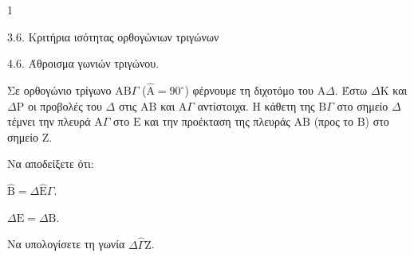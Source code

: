\begin{ylh}{1}
    \item 3.6. Κριτήρια ισότητας ορθογώνιων τριγώνων
    \item 4.6. Άθροισμα γωνιών τριγώνου.
\end{ylh}
Σε ορθογώνιο τρίγωνο $\mathrm{A}\mathrm{B}\Gamma$ ($\hat{\mathrm{A}} = 90^\circ$) φέρνουμε τη διχοτόμο του $\mathrm{A}\Delta$. Έστω $\Delta\mathrm{K}$ και $\Delta\mathrm{P}$ οι προβολές του $\Delta$ στις $\mathrm{A}\mathrm{B}$ και $\mathrm{A}\Gamma$ αντίστοιχα. Η κάθετη της $\mathrm{B}\Gamma$ στο σημείο $\Delta$ τέμνει την πλευρά $\mathrm{A}\Gamma$ στο $\mathrm{E}$ και την προέκταση της πλευράς $\mathrm{A}\mathrm{B}$ (προς το $\mathrm{B}$) στο σημείο $\mathrm{Z}$.
\begin{alist}
    \item Να αποδείξετε ότι:
    \begin{rlist}
        \item $\hat{\mathrm{B}} = \Delta\hat{\mathrm{E}}\Gamma$. 
        \item $\Delta\mathrm{E} = \Delta\mathrm{B}$. 
    \end{rlist}
    \item Να υπολογίσετε τη γωνία $\Delta\hat{\Gamma}\mathrm{Z}$. 
\end{alist}
